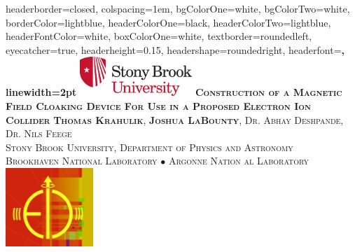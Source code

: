 \documentclass[landscape,a0paper,fontscale=0.290]{baposter} %
\begin{document}
\begin{poster}
{
headerborder=closed, %
colspacing=1em, %
bgColorOne=white, %
bgColorTwo=white, %
borderColor=lightblue, %
headerColorOne=black, %
headerColorTwo=lightblue, %
headerFontColor=white, %
boxColorOne=white, %
textborder=roundedleft, %
eyecatcher=true, %
headerheight=0.15\textheight, %
headershape=roundedright, %
headerfont=\Large\bf\textsc, %
linewidth=2pt %
}
%
{\includegraphics[height=4em]{SB_Logo.png}} %
{\bf\textsc{Construction of a Magnetic Field Cloaking Device For Use in a Proposed Electron Ion Collider}\vspace{0.5em}} %
{\textsc{\textbf{Thomas Krahulik}, \textbf{Joshua LaBounty}, Dr. Abhay Deshpande, Dr. Nils Feege \\ Stony Brook University, Department of Physics and Astronomy \\ Brookhaven National Laboratory $\bullet$ Argonne Nation al Laboratory}}%
{\hspace{10mm} \includegraphics[height=8em]{CreatedEICLogo.png}} %


\end{poster}
\end{document}
